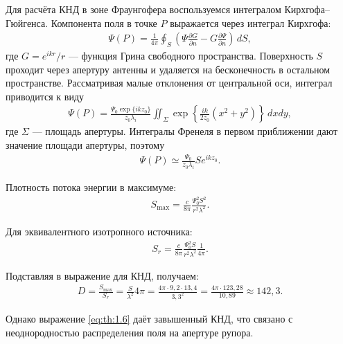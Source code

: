 Для расчёта КНД в зоне Фраунгофера воспользуемся интегралом Кирхгофа--Гюйгенса. Компонента поля в точке $P$ выражается через интеграл Кирхгофа:
\begin{align} \label{eq:th:1.1}
	\Psi(P) = \frac{1}{4\pi} \oint_S \left(\Psi \frac{\partial G}{\partial n} - G \frac{\partial \Psi}{\partial n}\right)\, dS,
\end{align}
где $G = e^{ikr}/r$ --- функция Грина свободного пространства. Поверхность $S$ проходит через апертуру антенны и удаляется на бесконечность в остальном пространстве. Рассматривая малые отклонения от центральной оси, интеграл приводится к виду
\begin{align} \label{eq:th:1.2}
	\Psi(P) = \frac{\Psi_0 \exp \{ikz_0\}}{z_0 \lambda_i} \iint_\Sigma \exp \left\{\frac{ik}{2z_0}(x^2 + y^2)\right\}\, dxdy,
\end{align}
где $\Sigma$ --- площадь апертуры. Интегралы Френеля в первом приближении дают значение площади апертуры, поэтому
\begin{align} \label{eq:th:1.3}
	\Psi(P) \simeq \frac{\Psi_0}{z_0 \lambda_i} S e^{ikz_0}.
\end{align}

Плотность потока энергии в максимуме:
\begin{align} \label{eq:th:1.4}
	S_{\max} = \frac{c}{8\pi} \frac{\Psi_0^2 S^2}{r^2 \lambda^2}.
\end{align}

Для эквивалентного изотропного источника:
\begin{align}\label{eq:th:1.5}
	S_r = \frac{c}{8\pi} \frac{\Psi_0^2 S}{r^2 \lambda^2} \frac{1}{4\pi}.
\end{align}

Подставляя в выражение для КНД, получаем:
\begin{align} \label{eq:th:1.6}
	D = \frac{S_{\max}}{S_r} = \frac{S}{\lambda^2} 4 \pi
	= \frac{4\pi \cdot 9{,}2 \cdot 13{,}4}{3{,}3^2}
	= \frac{4\pi \cdot 123{,}28}{10{,}89}
	\approx 142{,}3.
\end{align}

Однако выражение \cref{eq:th:1.6} даёт завышенный КНД, что связано с неоднородностью распределения поля на апертуре рупора.